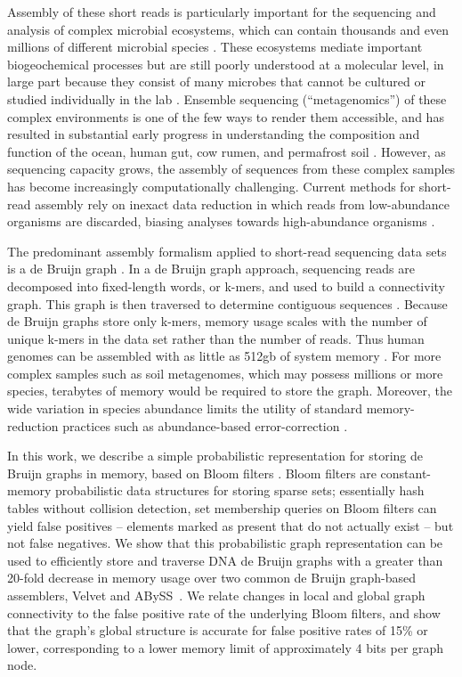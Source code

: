 \documentclass{pnastwo}
\begin{document}
\begin{article}
Assembly of these short reads is particularly important for the sequencing
and analysis of complex microbial ecosystems, which can contain
thousands and even millions of different microbial species \cite{pubmed20195499,pubmed16123304}.  These
ecosystems mediate important biogeochemical processes but are still
poorly understood at a molecular level, in large part because they
consist of many microbes that cannot be cultured or studied
individually in the lab \cite{pubmed20195499}.  Ensemble sequencing (``metagenomics'') of
these complex environments is one of the few ways to render them
accessible, and has resulted in substantial early progress in
understanding the composition and function of the ocean, human gut, cow
rumen, and permafrost soil \cite{metahit,rumen,sargasso,permafrost}.  However, as sequencing capacity grows,
the assembly of sequences from these complex samples has become
increasingly computationally challenging.  Current methods for short-read assembly rely on
inexact data reduction in which reads from low-abundance organisms are
discarded, biasing analyses towards high-abundance organisms \cite{metahit,rumen,permafrost}.

The predominant assembly formalism applied to short-read sequencing
data sets is a de Bruijn graph \cite{pubmed11504945,pubmed20211242,pubmed22068540}.
In a de Bruijn graph approach, sequencing reads are decomposed into
fixed-length words, or k-mers, and used to build a connectivity graph.
This graph is then traversed to determine contiguous sequences
\cite{pubmed22068540}.  Because de Bruijn graphs store only k-mers,
memory usage scales with the number of unique k-mers in the data set
rather than the number of reads.  Thus human genomes can be assembled
with as little as 512gb of system memory \cite{pmid21187386}.  For more
complex samples such as soil metagenomes, which may possess millions
or more species, terabytes of memory would be required to store the graph.  Moreover, the wide variation in species abundance
limits the utility of standard memory-reduction practices such as
abundance-based error-correction \cite{pubmed21114842}.

In this work, we describe a simple probabilistic representation for
storing de Bruijn graphs in memory, based on Bloom filters
\cite{bloom}.  Bloom filters are constant-memory probabilistic data
structures for storing sparse sets; essentially hash tables without collision
detection, set membership queries on Bloom filters can yield false
positives -- elements marked as present that do not actually exist --
but not false negatives.  We show that this probabilistic graph
representation can be used to efficiently store and traverse DNA de
Bruijn graphs with a greater than 20-fold decrease in memory usage
over two common de Bruijn graph-based assemblers, Velvet
and ABySS~\cite{velvet,abyss}. We relate 
changes in local and
global graph connectivity to the false positive rate of the underlying
Bloom filters, and show that the graph's global structure is accurate
for false positive rates of 15\% or lower, 
corresponding to a lower memory limit of approximately
4 bits per graph node.


\end{article}
\end{document}
